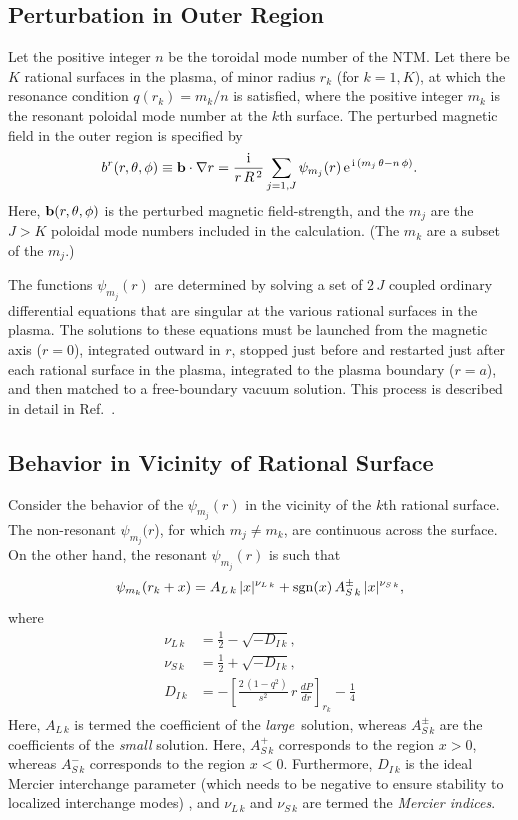 \documentclass{iopjournal}
\begin{document}
{\subsection{Perturbation in Outer Region}
Let the positive integer $n$ be the toroidal mode number of the NTM. Let there be $K$ rational surfaces in the plasma, of minor radius $r_k$ (for $k=1,K$),  at which the resonance condition
$q(r_k) = m_k/n$ is satisfied, where the positive integer $m_k$ is the resonant poloidal mode number at the $k$th surface. The perturbed magnetic field in the outer region is specified 
by \cite{tear9,tear10}
\begin{equation}\label{br}
b^r(r,\theta,\phi)\equiv {\bf b}\cdot\nabla r = \frac{{\rm i}}{r\,R^{\,2}}\sum_{j=1,J} \psi_{m_j}(r)\,{\rm e}^{\,{\rm i}\,(m_j\,\theta-n\,\phi)}.
\end{equation}
Here, ${\bf b}(r,\theta,\phi)$ is the perturbed magnetic field-strength, and the $m_j$ are the  $J>K$ poloidal mode numbers included in the calculation. (The $m_k$ are a subset of the $m_j$.) 

The functions $\psi_{m_j}(r)$ are determined by solving a set of $2\,J$ coupled ordinary differential equations that are singular at the
various rational surfaces in the plasma. The solutions to these equations must be launched from the magnetic axis ($r=0$), integrated outward in $r$, stopped   just before and  restarted just after each rational surface in the plasma, integrated to the plasma boundary ($r=a$), and then matched to a free-boundary vacuum
solution. This process is described in detail in Ref.~\cite{tear9}.

\subsection{Behavior in Vicinity of Rational Surface}\label{rational}
Consider the behavior of the $\psi_{m_j}(r)$ in the vicinity of the $k$th rational surface. 
The non-resonant $\psi_{m_j}(r$), for which $m_j\neq m_k$,   are continuous across the surface. On the other hand, the resonant $\psi_{m_j}(r)$ is
such that
\begin{align}\label{rat}
\psi_{m_k}(r_k+x) &= A_{L\,k}\,|x|^{\nu_{L\,k}} + {\rm sgn}(x)\,A_{S\,k}^{\pm}\,|x|^{\nu_{S\,k}},\\[0.5ex]
\end{align}
where
\begin{align}
\nu_{L\,k} &= \frac{1}{2}-\sqrt{-D_{I\,k}},\\[0.5ex]
\nu_{S\,k} &= \frac{1}{2}+\sqrt{-D_{I\,k}},\\[0.5ex]
D_{I\,k}&= - \left[\frac{2\,(1-q^2)}{s^2}\,r\,\frac{dP}{dr}\right]_{r_k} -\frac{1}{4}\label{di}
\end{align}
Here,  $A_{L\,k}$ is termed the coefficient of the {\em large}\, solution, whereas $A_{S\,k}^\pm$ are the coefficients of the {\em small}\/ solution.
Here, $A_{S\,k}^+$ corresponds to the region $x>0$, whereas  $A_{S\,k}^-$ corresponds to the region $x<0$. Furthermore, $D_{I\,k}$ is the ideal
Mercier interchange parameter (which needs to be negative to ensure stability to localized interchange modes) \cite{mercier,ggj,ggj1}, and $\nu_{L\,k}$ and $\nu_{S\,k}$
are termed the {\em Mercier indices}. 

}
\end{document}
